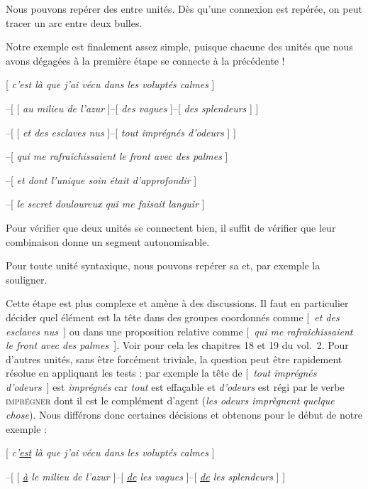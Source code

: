 \begin{tblsframed}{}
\noindent Nous pouvons repérer des  entre unités. Dès qu’une connexion est repérée, on peut tracer un arc entre deux bulles.
\end{tblsframed}

Notre exemple est finalement assez simple, puisque chacune des unités que nous avons dégagées à la première étape se connecte à la précédente !

\ea{}
[ \textit{c’est là que j’ai vécu dans les voluptés calmes} ]

–[ [ \textit{au milieu de l’azur} ]–[ \textit{des vagues} ]–[ \textit{des splendeurs} ] ]

–[ [ \textit{et des esclaves nus} ]–[ \textit{tout imprégnés d’odeurs} ] ]

–[ \textit{qui me rafraîchissaient le front avec des palmes} ]

–[ \textit{et dont l’unique soin était d’approfondir} ]

–[ \textit{le secret douloureux qui me faisait languir} ]
\z

Pour vérifier que deux unités se connectent bien, il suffit de vérifier que leur combinaison donne un segment autonomisable.

\begin{tblsframed}{}
\noindent Pour toute unité syntaxique, nous pouvons repérer sa  et, par exemple la souligner.
\end{tblsframed}

Cette étape est plus complexe et amène à des discussions. Il faut en particulier décider quel élément est la tête dans des groupes coordonnés comme [~\textit{et des esclaves nus~}] ou dans une proposition relative comme [~\textit{qui me rafraîchissaient le front avec des palmes~}]. Voir pour cela les  chapitres 18 et 19 du vol.\ 2. %
Pour d’autres unités, sans être forcément triviale, la question peut être rapidement résolue en appliquant les tests : par exemple la tête de [~\textit{tout imprégnés d’odeurs~}] est \textit{imprégnés} car \textit{tout} est effaçable et \textit{d’odeurs} est régi par le verbe \textsc{imprégner} dont il est le complément d’agent (\textit{les odeurs imprègnent quelque chose}). Nous différons donc certaines décisions et obtenons pour le début de notre exemple :

\ea{}
[ \textit{c’\uline{est} là que j’ai vécu dans les voluptés calmes} ]

–[ [ \textit{\uline{à} le milieu de l’azur} ]–[ \textit{\uline{de} les vagues} ]–[ \textit{\uline{de} les splendeurs} ] ]

